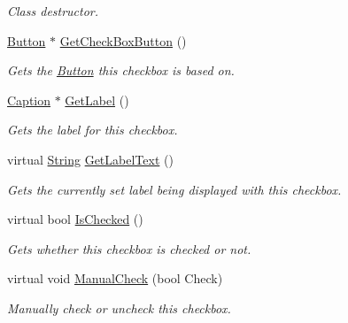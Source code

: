 \begin{DoxyCompactItemize}
\begin{DoxyCompactList}\small\item\em Class destructor. \item\end{DoxyCompactList}\item 
\hyperlink{classMezzanine_1_1UI_1_1Button}{Button} $\ast$ \hyperlink{classMezzanine_1_1UI_1_1CheckBox_a08fcd8aa8c6a521f4f08dc3ae6984936}{GetCheckBoxButton} ()
\begin{DoxyCompactList}\small\item\em Gets the \hyperlink{classMezzanine_1_1UI_1_1Button}{Button} this checkbox is based on. \item\end{DoxyCompactList}\item 
\hyperlink{classMezzanine_1_1UI_1_1Caption}{Caption} $\ast$ \hyperlink{classMezzanine_1_1UI_1_1CheckBox_adde59a08d00bad4085aad204d29d48d1}{GetLabel} ()
\begin{DoxyCompactList}\small\item\em Gets the label for this checkbox. \item\end{DoxyCompactList}\item 
virtual \hyperlink{namespaceMezzanine_acf9fcc130e6ebf08e3d8491aebcf1c86}{String} \hyperlink{classMezzanine_1_1UI_1_1CheckBox_a842ef69f568681a4e3b50d1b411467f6}{GetLabelText} ()
\begin{DoxyCompactList}\small\item\em Gets the currently set label being displayed with this checkbox. \item\end{DoxyCompactList}\item 
virtual bool \hyperlink{classMezzanine_1_1UI_1_1CheckBox_aafe54951cd6a51b6ad43abb5fd29696d}{IsChecked} ()
\begin{DoxyCompactList}\small\item\em Gets whether this checkbox is checked or not. \item\end{DoxyCompactList}\item 
virtual void \hyperlink{classMezzanine_1_1UI_1_1CheckBox_a83801877bb5b9de0f61895dabe4d0c62}{ManualCheck} (bool Check)
\begin{DoxyCompactList}\small\item\em Manually check or uncheck this checkbox. \item\end{DoxyCompactList}\item 

\end{DoxyCompactItemize}

